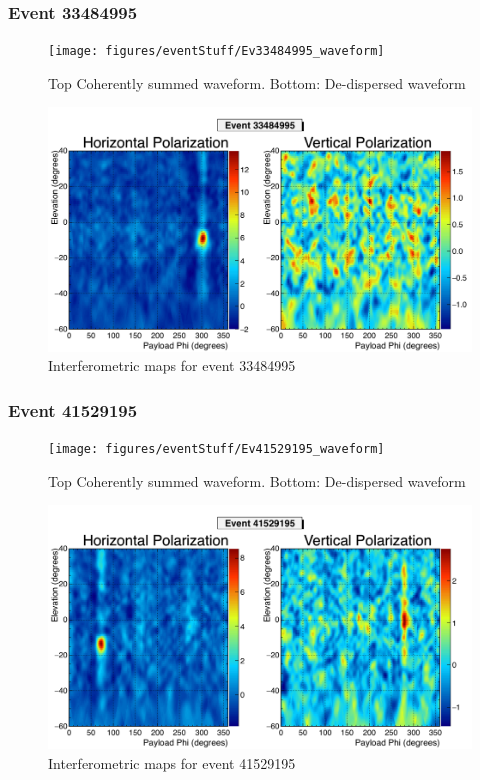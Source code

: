 		\subsubsection{Event 33484995}
		\begin{figure}
		\centering
			\texttt{[image: figures/eventStuff/Ev33484995\_waveform]}
			\caption{Top Coherently summed waveform.  Bottom: De-dispersed waveform} 
		\label{fig:Ev33484995_waveform}
		\end{figure}
		
		\begin{figure}
		\centering
			\includegraphics[width=\textwidth]{figures/intMap/intMap_ev33484995}
			\caption{Interferometric maps for event 33484995} 
		\label{fig:Ev33484995_map}
		\end{figure}			
	
		\subsubsection{Event 41529195}
		\begin{figure}
		\centering
			\texttt{[image: figures/eventStuff/Ev41529195\_waveform]}
			\caption{Top Coherently summed waveform.  Bottom: De-dispersed waveform} 
		\label{fig:Ev41529195_waveform}
		\end{figure}
		
		\begin{figure}
		\centering
			\includegraphics[width=\textwidth]{figures/intMap/intMap_ev41529195}
			\caption{Interferometric maps for event 41529195} 
		\label{fig:Ev41529195_map}
		\end{figure}			
	

